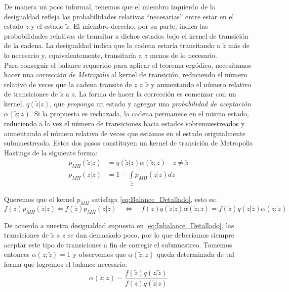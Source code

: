 De manera un poco informal, tenemos que el miembro izquierdo de la desigualdad refleja las probabilidades relativas ``necesarias'' entre estar en el estado $z$ y el estado $\tilde{z}$. El miembro derecho, por su parte, indica las probabilidades relativas de transitar a dichos estados bajo el kernel de transición de la cadena. La desigualdad indica que la cadena estaría transitando a $\tilde{z}$ más de lo necesario y, equivalentemente, transitaría a $z$ menos de lo necesario.\\ 

Para conseguir el balance requerido para aplicar el teorema ergódico, necesitamos hacer una \textit{corrección de Metropolis} al kernel de transición, reduciendo el número relativo de veces que la cadena transite de $z$ a $\tilde{z}$ y aumentando el número relativo de transiciones de $\tilde{z}$ a $z$. La forma de hacer la corrección es comenzar con un kernel, $q(\tilde{z}|z)$, que \textit{proponga} un estado y agregar una \textit{probabilidad de aceptación} $\alpha(\tilde{z};z)$. Si la propuesta es rechazada, la cadena permanece en el mismo estado, reduciendo a la vez el número de transiciones hacia estados sobremuestreados y aumentando el número relativo de veces que estamos en el estado originalmente submuestreado. Estos dos pasos constituyen un kernel de transición de Metropolis Hastings de la siguiente forma: 
\begin{align*}
p_{\scriptscriptstyle{MH}}(\tilde{z}|z) &= q(\tilde{z}|z)\alpha(\tilde{z};z) \quad z \neq \tilde{z} \\
p_{\scriptscriptstyle{MH}}(z|z) &= 1 - \int\limits_{\tilde{\mathcal{Z}}} p_{\scriptscriptstyle{MH}}(\tilde{z}|z)d\tilde{z}
\end{align*}

Queremos que el kernel $p_{\scriptscriptstyle{MH}}$ satisfaga \eqref{eq:Balance_Detallado}, esto es:
\begin{equation*}
f(z)p_{\scriptscriptstyle{MH}}(\tilde{z}|z)=f(\tilde{z})p_{\scriptscriptstyle{MH}}(z|\tilde{z}) \quad \Leftrightarrow \quad f(z)q(\tilde{z}|z)\alpha(\tilde{z};z)=f(\tilde{z})q(z|\tilde{z})\alpha(z;\tilde{z}) 
\end{equation*}

De acuerdo a nuestra desigualdad supuesta en \eqref{eq:Inbalance_Detallado}, las transiciones de $\tilde{z}$ a $z$ se dan demasiado poco, por lo que deberíamos siempre aceptar este tipo de transiciones a fin de corregir el submuestreo. Tomemos entonces $\alpha(z;\tilde{z}) = 1$ y observemos que $\alpha(\tilde{z};z)$ queda determinada de tal forma que logremos el balance necesario: 
\begin{equation*}
\alpha(\tilde{z};z)=\dfrac{f(\tilde{z})q(z|\tilde{z})}{f(z)q(\tilde{z}|z)}
\end{equation*}

